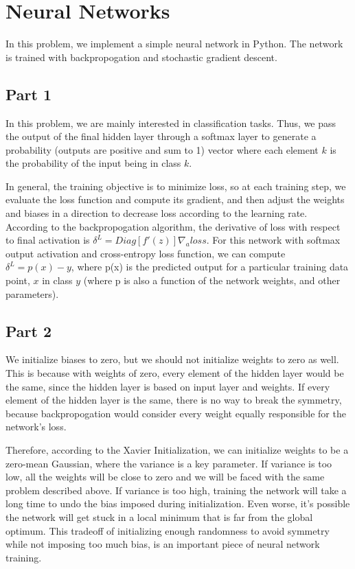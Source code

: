 \section{Neural Networks} \label{sec:prob1}
In this problem, we implement a simple neural network in Python.
The network is trained with backpropogation and stochastic gradient descent.

\subsection{Part 1}
In this problem, we are mainly interested in classification tasks.
Thus, we pass the output of the final hidden layer through a softmax layer to generate a probability (outputs are positive and sum to 1) vector where each element $k$ is the probability of the input being in class $k$.

In general, the training objective is to minimize loss, so at each training step, we evaluate the loss function and compute its gradient, and then adjust the weights and biases in a direction to decrease loss according to the learning rate.
According to the backpropogation algorithm, the derivative of loss with respect to final activation is $\delta^L = Diag[f'(z)] \nabla_a loss$.
For this network with softmax output activation and cross-entropy loss function, we can compute $\delta^L = p(x) - y$, where p(x) is the predicted output for a particular training data point, $x$ in class $y$ (where p is also a function of the network weights, and other parameters).


\subsection{Part 2}
We initialize biases to zero, but we should not initialize weights to zero as well.
This is because with weights of zero, every element of the hidden layer would be the same, since the hidden layer is based on input layer and weights.
If every element of the hidden layer is the same, there is no way to break the symmetry, because backpropogation would consider every weight equally responsible for the network's loss.

Therefore, according to the Xavier Initialization, we can initialize weights to be a zero-mean Gaussian, where the variance is a key parameter.
If variance is too low, all the weights will be close to zero and we will be faced with the same problem described above.
If variance is too high, training the network will take a long time to undo the bias imposed during initialization.
Even worse, it's possible the network will get stuck in a local minimum that is far from the global optimum.
This tradeoff of initializing enough randomness to avoid symmetry while not imposing too much bias, is an important piece of neural network training.

